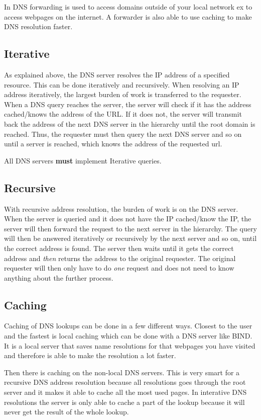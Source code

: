 In DNS forwarding is used to access domains outside of your local network ex to access webpages on the internet. A forwarder is also able to use caching to make DNS resolution faster.
\subsection{Iterative}
As explained above, the DNS server resolves the IP address of a specified resource. This can be done iteratively and recursively.
When resolving an IP address iteratively, the largest burden of work is transferred to the requester. 
When a DNS query reaches the server, the server will check if it has the address cached/knows the address of the URL. If it does not, the server will transmit back the address of the next DNS server in the hierarchy until the root domain is reached.
Thus, the requester must then query the next DNS server and so on until a server is reached, which knows the address of the requested url.

All DNS servers \textbf{must} implement Iterative queries.

\subsection{Recursive}
With recursive address resolution, the burden of work is on the DNS server. When the server is queried and it does not have the IP cached/know the IP, the server will then forward the request to the next server in the hierarchy. The query will then be answered iteratively or recursively by the next server and so on, until the correct address is found.
The server then waits until it gets the correct address and \textit{then} returns the address to the original requester. The original requester will then only have to do \textit{one} request and does not need to know anything about the further process. 

\subsection{Caching}
Caching of DNS lookups can be done in a few different ways. Closest to the user and the fastest is local caching which can be done with a DNS server like BIND. It is a local server that saves name resolutions for that webpages you have visited and therefore is able to make the resolution a lot faster.

Then there is caching on the non-local DNS servers. This is very smart for a recursive DNS address resolution because all resolutions goes through the root server and it makes it able to cache all the most used pages. In interative DNS resolutions the server is only able to cache a part of the lookup because it will never get the result of the whole lookup.

